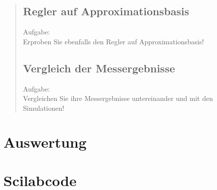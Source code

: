 \begin{quote}
\begin{quote}
    \end{quote}
    
    
    \subsection{Regler auf Approximationsbasis}
    
    Aufgabe:\\
    Erproben Sie ebenfalls den Regler auf Approximationsbasis!\vspace{1em}
    
    \begin{quote}
        
    \end{quote}
    
    
    \subsection{Vergleich der Messergebnisse}
    
    Aufgabe:\\
    Vergleichen Sie ihre Messergebnisse untereinander und mit den Simulationen!
    
    \begin{quote}
        
    \end{quote}
    
    
    
    
\end{quote}



\section{Auswertung}
\begin{quote}
    
\end{quote} %



\section{Scilabcode}
\begin{quote}
%     


\end{quote} %

